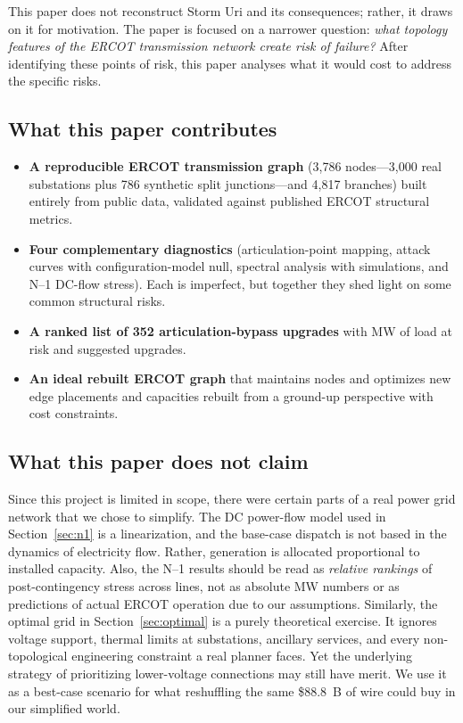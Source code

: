 \documentclass[12pt,letterpaper]{article}
\begin{document}
This paper does not reconstruct Storm Uri and its consequences; rather, it draws on it for motivation. The paper is focused on a narrower question: \emph{what topology features of the ERCOT transmission network create risk of failure?} After identifying these points of risk, this paper analyses what it would cost to address the specific risks.

\subsection{What this paper contributes}

\begin{itemize}
    \item \textbf{A reproducible ERCOT transmission graph} (3{,}786 nodes---3{,}000 real substations plus 786 synthetic split junctions---and 4{,}817 branches) built entirely from public data, validated against published ERCOT structural metrics.
    \item \textbf{Four complementary diagnostics} (articulation-point mapping, attack curves with configuration-model null, spectral analysis with simulations, and N--1 DC-flow stress). Each is imperfect, but together they shed light on some common structural risks.
    \item \textbf{A ranked list of 352 articulation-bypass upgrades} with MW of load at risk and suggested upgrades.
    \item \textbf{An ideal rebuilt ERCOT graph} that maintains nodes and optimizes new edge placements and capacities rebuilt from a ground-up perspective with cost constraints.
\end{itemize}

\subsection{What this paper does not claim}

Since this project is limited in scope, there were certain parts of a real power grid network that we chose to simplify. The DC power-flow model used in Section~\ref{sec:n1} is a linearization, and the base-case dispatch is not based in the dynamics of electricity flow. Rather, generation is allocated proportional to installed capacity. Also, the N--1 results should be read as \emph{relative rankings} of post-contingency stress across lines, not as absolute MW numbers or as predictions of actual ERCOT operation due to our assumptions. Similarly, the optimal grid in Section~\ref{sec:optimal} is a purely theoretical exercise. It ignores voltage support, thermal limits at substations, ancillary services, and every non-topological engineering constraint a real planner faces. Yet the underlying strategy of prioritizing lower-voltage connections may still have merit. We use it as a best-case scenario for what reshuffling the same \$88.8~B of wire could buy in our simplified world.
\end{document}
